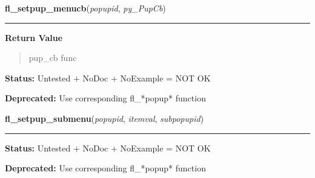     \label{xformslib:deprecated:fl_setpup_menucb}

    \vspace{0.5ex}

\hspace{.8\funcindent}\begin{boxedminipage}{\funcwidth}

    \raggedright \textbf{fl\_setpup\_menucb}(\textit{popupid}, \textit{py\_PupCb})

    \vspace{-1.5ex}

    \rule{\textwidth}{0.5\fboxrule}
\setlength{\parskip}{2ex}
\setlength{\parskip}{1ex}
      \textbf{Return Value}
    \vspace{-1ex}

      \begin{quote}
      pup\_cb func

      \end{quote}

\textbf{Status:} Untested + NoDoc + NoExample = NOT OK



\textbf{Deprecated:} Use corresponding fl\_*popup* function



    \end{boxedminipage}

    \label{xformslib:deprecated:fl_setpup_submenu}

    \vspace{0.5ex}

\hspace{.8\funcindent}\begin{boxedminipage}{\funcwidth}

    \raggedright \textbf{fl\_setpup\_submenu}(\textit{popupid}, \textit{itemval}, \textit{subpopupid})

    \vspace{-1.5ex}

    \rule{\textwidth}{0.5\fboxrule}
\setlength{\parskip}{2ex}
\setlength{\parskip}{1ex}
\textbf{Status:} Untested + NoDoc + NoExample = NOT OK



\textbf{Deprecated:} Use corresponding fl\_*popup* function



    \end{boxedminipage}


